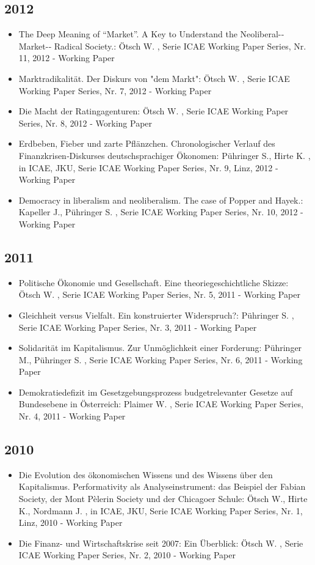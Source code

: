  \subsection{2012} 
 \begin{itemize} 
	 \item The Deep Meaning of “Market”. A Key to Understand the Neoliberal-­‐Market-­‐ Radical Society.: Ötsch W. , Serie ICAE Working Paper Series, Nr. 11, 2012 - Working Paper
	 \item Marktradikalität. Der Diskurs von "dem Markt": Ötsch W. , Serie ICAE Working Paper Series, Nr. 7, 2012 - Working Paper
	 \item Die Macht der Ratingagenturen: Ötsch W. , Serie ICAE Working Paper Series, Nr. 8, 2012 - Working Paper
	 \item Erdbeben, Fieber und zarte Pflänzchen. Chronologischer Verlauf des Finanzkrisen‐Diskurses deutschsprachiger Ökonomen: Pühringer S., Hirte K. , in ICAE, JKU, Serie ICAE Working Paper Series, Nr. 9, Linz, 2012 - Working Paper
	 \item Democracy in liberalism and neoliberalism. The case of Popper and Hayek.: Kapeller J., Pühringer S. , Serie ICAE Working Paper Series, Nr. 10, 2012 - Working Paper
\end{itemize} 
 \subsection{2011} 
 \begin{itemize} 
	 \item Politische Ökonomie und Gesellschaft. Eine theoriegeschichtliche Skizze: Ötsch W. , Serie ICAE Working Paper Series, Nr. 5, 2011 - Working Paper
	 \item Gleichheit versus Vielfalt. Ein konstruierter Widerspruch?: Pühringer S. , Serie ICAE Working Paper Series, Nr. 3, 2011 - Working Paper
	 \item Solidarität im Kapitalismus. Zur Unmöglichkeit einer Forderung: Pühringer M., Pühringer S. , Serie ICAE Working Paper Series, Nr. 6, 2011 - Working Paper
	 \item Demokratiedefizit im Gesetzgebungsprozess budgetrelevanter Gesetze auf Bundesebene in Österreich: Plaimer W. , Serie ICAE Working Paper Series, Nr. 4, 2011 - Working Paper
\end{itemize} 
 \subsection{2010} 
 \begin{itemize} 
	 \item Die Evolution des ökonomischen Wissens und des Wissens über den Kapitalismus. Performativity als Analyseinstrument: das Beispiel der Fabian Society, der Mont Pèlerin Society und der Chicagoer Schule: Ötsch W., Hirte K., Nordmann J. , in ICAE, JKU, Serie ICAE Working Paper Series, Nr. 1, Linz, 2010 - Working Paper
	 \item Die Finanz-­ und Wirtschaftskrise seit 2007: Ein Überblick: Ötsch W. , Serie ICAE Working Paper Series, Nr. 2, 2010 - Working Paper
\end{itemize}